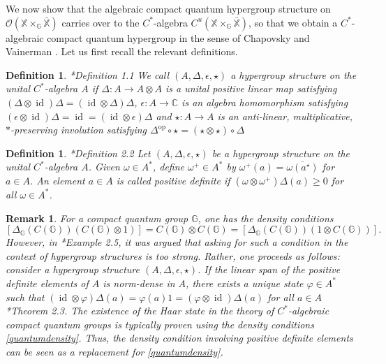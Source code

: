 \documentclass[reqno]{amsart}
\numberwithin{equation}{section}
\newtheorem{Def}[Theorem]{Definition}
\newtheorem{Rem}[Theorem]{Remark}
\newcommand\XGX{\X\times_\G \bar{\X}}
\DeclareMathOperator{\id}{\mathrm{id}}
\newcommand{\op}{\mathrm{op}}
\newcommand{\mcO}{\mathcal{O}}
\newcommand{\C}{\mathbb{C}}
\newcommand{\G}{\mathbb{G}}
\newcommand{\X}{\mathbb{X}}
\begin{document}
We now show that the algebraic compact quantum hypergroup structure on $\mcO(\XGX)$ carries over to the $C^*$-algebra $C^u(\XGX)$, so that we obtain a $C^*$-algebraic compact quantum hypergroup in the sense of Chapovsky and Vainerman \cite{CV99}. Let us first recall the relevant definitions.

\begin{Def}\cite{CV99}*{Definition 1.1}  We call $(A, \Delta, \epsilon, \star)$ a hypergroup structure on the unital $C^*$-algebra $A$ if $\Delta: A\to A\otimes A$ is a unital positive linear map satisfying $(\Delta\otimes \id)\Delta=  (\id \otimes \Delta)\Delta$, $\epsilon: A \to \C$ is an algebra homomorphism satisfying $(\epsilon\otimes \id)\Delta= \id = (\id \otimes \epsilon)\Delta$ and $\star: A\to A$ is an anti-linear, multiplicative, $*$-preserving involution satisfying $\Delta^{\op}\circ \star= (\star\otimes \star)\circ \Delta$
\end{Def}

\begin{Def} \cite{CV99}*{Definition 2.2}
    Let $(A, \Delta, \epsilon, \star)$ be a hypergroup structure on the unital $C^*$-algebra $A$. Given $\omega \in A^*$, define $\omega^+\in A^*$ by $\omega^+(a)= \overline{\omega(a^\star)}$ for $a\in A$. An element $a\in A$ is called \emph{positive definite} if $(\omega \otimes \omega^+)\Delta(a)\ge 0$ for all $\omega \in A^*$.
\end{Def}

\begin{Rem}\label{hame}
    For a compact quantum group $\G$, one has the density conditions
\begin{equation}\label{quantumdensity}
    [\Delta_\G(C(\G))(C(\G)\otimes 1)]= C(\G)\otimes C(\G)= [\Delta_\G(C(\G))(1\otimes C(\G))].
\end{equation}
However, in \cite{CV99}*{Example 2.5}, it was argued that asking for such a condition in the context of hypergroup structures is too strong. Rather, one proceeds as follows: consider a hypergroup structure $(A, \Delta, \epsilon, \star)$. If the linear span of the positive definite elements of $A$ is norm-dense in $A$, there exists a unique state $\varphi\in A^*$ such that $(\id \otimes \varphi)\Delta(a)= \varphi(a)1= (\varphi\otimes \id)\Delta(a)$ for all $a\in A$ \cite{CV99}*{Theorem 2.3}. The existence of the Haar state in the theory of $C^*$-algebraic compact quantum groups is typically proven using the density conditions \eqref{quantumdensity}. Thus, the density condition involving positive definite elements can be seen as a  replacement for \eqref{quantumdensity}. 
\end{Rem}
\end{document}
